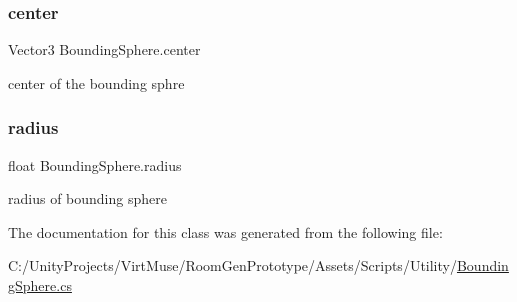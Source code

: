 \subsubsection{\texorpdfstring{center}{center}}
{\footnotesize\ttfamily Vector3 Bounding\+Sphere.\+center}



center of the bounding sphre 

\mbox{\label{class_bounding_sphere_ad507cd54bc4021617024c2545fe9379c}} 
\subsubsection{\texorpdfstring{radius}{radius}}
{\footnotesize\ttfamily float Bounding\+Sphere.\+radius}



radius of bounding sphere 



The documentation for this class was generated from the following file\+:\begin{DoxyCompactItemize}
\item 
C\+:/\+Unity\+Projects/\+Virt\+Muse/\+Room\+Gen\+Prototype/\+Assets/\+Scripts/\+Utility/\mbox{\hyperlink{_bounding_sphere_8cs}{Bounding\+Sphere.\+cs}}\end{DoxyCompactItemize}
